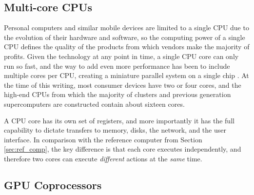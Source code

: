 \subsection{Multi-core CPUs}

Personal computers and similar mobile devices are limited
to a single CPU due to the evolution of their hardware and
software, so the computing power of a single CPU defines
the quality of the products from which vendors make
the majority of profits.
Given the technology at any point in time, a single CPU
core can only run so fast, and the way to add even more performance
has been to include multiple cores per CPU,
creating a miniature parallel system on a single chip
\cite{hennessy2011computer}.
At the time of this writing, most consumer devices
have two or four cores, and the high-end CPUs from
which the majority of clusters and previous generation
supercomputers are constructed
contain about sixteen cores.

A CPU core has its own set of registers, and more importantly
it has the full capability to dictate transfers to memory,
disks, the network, and the user interface.
In comparison with the reference computer from Section \ref{sec:ref_comp},
the key difference is that each core executes independently,
and therefore two cores can execute \emph{different} actions
at the \emph{same} time.

\subsection{GPU Coprocessors}
\label{sec:def_gpu}

